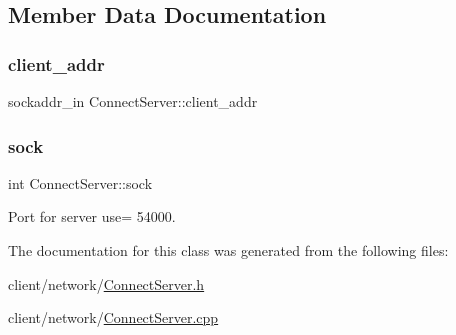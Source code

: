\subsection{Member Data Documentation}
\mbox{\label{class_connect_server_ab24487ababb0a449c7f4874f3fa2e218}} 
\subsubsection{\texorpdfstring{client\+\_\+addr}{client\_addr}}
{\footnotesize\ttfamily sockaddr\+\_\+in Connect\+Server\+::client\+\_\+addr\hspace{0.3cm}{\ttfamily [protected]}}

\mbox{\label{class_connect_server_ace72614112a76ddb8e7c549a7d66d57f}} 
\subsubsection{\texorpdfstring{sock}{sock}}
{\footnotesize\ttfamily int Connect\+Server\+::sock\hspace{0.3cm}{\ttfamily [protected]}}



Port for server use= 54000. 



The documentation for this class was generated from the following files\+:\begin{DoxyCompactItemize}
\item 
client/network/\hyperlink{_connect_server_8h}{Connect\+Server.\+h}\item 
client/network/\hyperlink{_connect_server_8cpp}{Connect\+Server.\+cpp}\end{DoxyCompactItemize}
